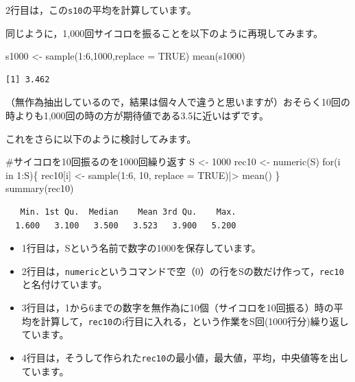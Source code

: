 \documentclass[
  letterpaper,
  DIV=11,
  numbers=noendperiod]{scrreprt}
\newenvironment{Shaded}{\begin{snugshade}}{\end{snugshade}}
\newcommand{\AttributeTok}[1]{\textcolor[rgb]{0.40,0.45,0.13}{#1}}
\newcommand{\CommentTok}[1]{\textcolor[rgb]{0.37,0.37,0.37}{#1}}
\newcommand{\ConstantTok}[1]{\textcolor[rgb]{0.56,0.35,0.01}{#1}}
\newcommand{\ControlFlowTok}[1]{\textcolor[rgb]{0.00,0.23,0.31}{#1}}
\newcommand{\DecValTok}[1]{\textcolor[rgb]{0.68,0.00,0.00}{#1}}
\newcommand{\FunctionTok}[1]{\textcolor[rgb]{0.28,0.35,0.67}{#1}}
\newcommand{\NormalTok}[1]{\textcolor[rgb]{0.00,0.23,0.31}{#1}}
\newcommand{\OtherTok}[1]{\textcolor[rgb]{0.00,0.23,0.31}{#1}}
\newcommand{\SpecialCharTok}[1]{\textcolor[rgb]{0.37,0.37,0.37}{#1}}
\providecommand{\tightlist}{%
  \setlength{\itemsep}{0pt}\setlength{\parskip}{0pt}}\usepackage{longtable,booktabs,array}
\begin{document}
2行目は，この\texttt{s10}の平均を計算しています。

同じように，1,000回サイコロを振ることを以下のように再現してみます。

\begin{Shaded}
\begin{Highlighting}[]
\NormalTok{s1000 }\OtherTok{\textless{}{-}} \FunctionTok{sample}\NormalTok{(}\DecValTok{1}\SpecialCharTok{:}\DecValTok{6}\NormalTok{,}\DecValTok{1000}\NormalTok{,}\AttributeTok{replace =} \ConstantTok{TRUE}\NormalTok{)}
\FunctionTok{mean}\NormalTok{(s1000)}
\end{Highlighting}
\end{Shaded}

\begin{verbatim}
[1] 3.462
\end{verbatim}

（無作為抽出しているので，結果は個々人で違うと思いますが）おそらく10回の時よりも1,000回の時の方が期待値である3.5に近いはずです。

これをさらに以下のように検討してみます。

\begin{Shaded}
\begin{Highlighting}[]
\CommentTok{\#サイコロを10回振るのを1000回繰り返す}
\NormalTok{S }\OtherTok{\textless{}{-}} \DecValTok{1000}
\NormalTok{rec10 }\OtherTok{\textless{}{-}} \FunctionTok{numeric}\NormalTok{(S)}
\ControlFlowTok{for}\NormalTok{(i }\ControlFlowTok{in} \DecValTok{1}\SpecialCharTok{:}\NormalTok{S)\{}
\NormalTok{  rec10[i] }\OtherTok{\textless{}{-}} \FunctionTok{sample}\NormalTok{(}\DecValTok{1}\SpecialCharTok{:}\DecValTok{6}\NormalTok{, }\DecValTok{10}\NormalTok{, }\AttributeTok{replace =} \ConstantTok{TRUE}\NormalTok{)}\SpecialCharTok{|\textgreater{}}
    \FunctionTok{mean}\NormalTok{()}
\NormalTok{\}}
\FunctionTok{summary}\NormalTok{(rec10)}
\end{Highlighting}
\end{Shaded}

\begin{verbatim}
   Min. 1st Qu.  Median    Mean 3rd Qu.    Max. 
  1.600   3.100   3.500   3.523   3.900   5.200 
\end{verbatim}

\begin{itemize}
\tightlist
\item
  1行目は，Sという名前で数字の1000を保存しています。
\item
  2行目は，\texttt{numeric}というコマンドで空（0）の行をSの数だけ作って，\texttt{rec10}と名付けています。
\item
  3行目は，1から6までの数字を無作為に10個（サイコロを10回振る）時の平均を計算して，\texttt{rec10}のi行目に入れる，という作業をS回(1000行分)繰り返しています。
\item
  4行目は，そうして作られた\texttt{rec10}の最小値，最大値，平均，中央値等を出しています。
\end{itemize}
\end{document}
